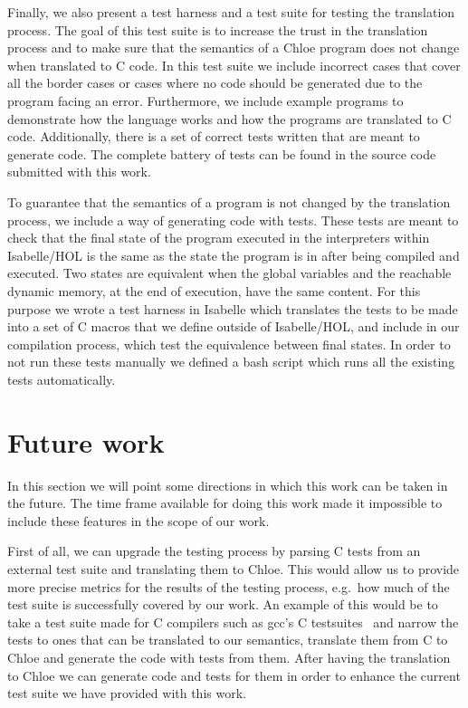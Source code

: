Finally, we also present a test harness and a test suite for testing the translation process.
The goal of this test suite is to increase the trust in the translation process and to make sure that the semantics of a Chloe program does not change when translated to C code.
In this test suite we include incorrect cases that cover all the border cases or cases where no code should be generated due to the program facing an error.
Furthermore, we include example programs to demonstrate how the language works and how the programs are translated to C code.
Additionally, there is a set of correct tests written that are meant to generate code.
The complete battery of tests can be found in the source code submitted with this work.

To guarantee that the semantics of a program is not changed by the translation process, we include a way of generating code with tests.
These tests are meant to check that the final state of the program executed in the interpreters within Isabelle/HOL is the same as the state the program is in after being compiled and executed.
Two states are equivalent when the global variables and the reachable dynamic memory, at the end of execution, have the same content.
For this purpose we wrote a test harness in Isabelle which translates the tests to be made into a set of C macros that we define outside of Isabelle/HOL, and include in our compilation process, which test the equivalence between final states.
In order to not run these tests manually we defined a bash script which runs all the existing tests automatically.

\section{Future work}

In this section we will point some directions in which this work can be taken in the future.
The time frame available for doing this work made it impossible to include these features in the scope of our work.

First of all, we can upgrade the testing process by parsing C tests from an external test suite and translating them to Chloe.
This would allow us to provide more precise metrics for the results of the testing process, e.g.\ how much of the test suite is successfully covered by our work.
An example of this would be to take a test suite made for C compilers such as gcc's C testsuites~\parencite{gcc-tests} and narrow the tests to ones that can be translated to our semantics, translate them from C to Chloe and generate the code with tests from them.
After having the translation to Chloe we can generate code and tests for them in order to enhance the current test suite we have provided with this work.

